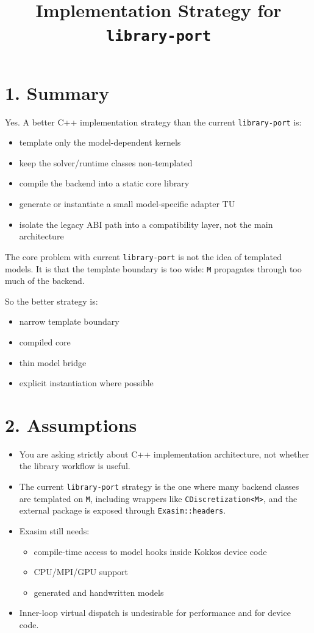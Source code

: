 \documentclass[11pt]{article}
\title{Implementation Strategy for \texttt{library-port}}
\author{}
\date{}
\begin{document}
\maketitle

\section*{1. Summary}

Yes. A better C++ implementation strategy than the current \texttt{library-port} is:

\begin{itemize}[leftmargin=*]
\item template only the model-dependent kernels
\item keep the solver/runtime classes non-templated
\item compile the backend into a static core library
\item generate or instantiate a small model-specific adapter TU
\item isolate the legacy ABI path into a compatibility layer, not the main architecture
\end{itemize}

The core problem with current \texttt{library-port} is not the idea of templated models. It is that the template boundary is too wide: \texttt{M} propagates through too much of the backend.

So the better strategy is:

\begin{itemize}[leftmargin=*]
\item narrow template boundary
\item compiled core
\item thin model bridge
\item explicit instantiation where possible
\end{itemize}

\section*{2. Assumptions}

\begin{itemize}[leftmargin=*]
\item You are asking strictly about C++ implementation architecture, not whether the library workflow is useful.
\item The current \texttt{library-port} strategy is the one where many backend classes are templated on \texttt{M}, including wrappers like \texttt{CDiscretization<M>}, and the external package is exposed through \texttt{Exasim::headers}.
\item Exasim still needs:
\begin{itemize}[leftmargin=*]
\item compile-time access to model hooks inside Kokkos device code
\item CPU/MPI/GPU support
\item generated and handwritten models
\end{itemize}
\item Inner-loop virtual dispatch is undesirable for performance and for device code.
\end{itemize}
\end{document}
